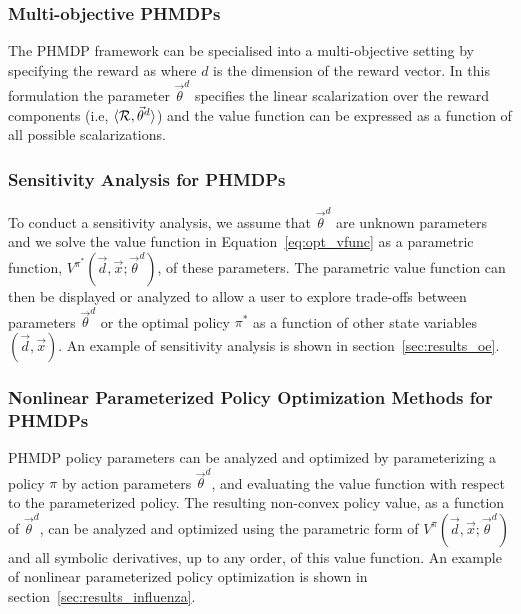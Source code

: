 \subsubsection{Multi-objective PHMDPs}

The PHMDP framework can be specialised into a multi-objective setting
by specifying the reward as {\footnotesize \MORewardFunc} where
{\footnotesize $ d $} is the dimension of the reward vector. In this
formulation the parameter {\footnotesize $ \vec{\theta}^{d} $} specifies the
linear scalarization over the reward components (i.e, {\footnotesize $\langle
\mathcal{R}, \vec{\theta}^{d} \rangle$}) and the value function can be expressed
as a function of all possible scalarizations.

\subsubsection{Sensitivity Analysis for PHMDPs}

To conduct a sensitivity analysis, we assume that {\footnotesize $\vec{\theta}^{d}$} are unknown parameters and we solve the value function in Equation~\eqref{eq:opt_vfunc} as a parametric function, {\footnotesize $V^{\pi^{*}}(\vec{d}, \vec{x}; \vec{\theta}^{d})$}, of these parameters. The parametric value function can then be displayed or analyzed to allow a user to explore trade-offs between parameters {\footnotesize $\vec{\theta}^{d}$} or the optimal policy {\footnotesize $ \pi^{*} $} as a function of other state variables {\footnotesize $(\vec{d}, \vec{x})$}. An example of sensitivity analysis is shown in section~\ref{sec:results_oe}.

\subsubsection{Nonlinear Parameterized Policy Optimization Methods for PHMDPs}

PHMDP policy parameters can be analyzed and optimized by parameterizing a policy {\footnotesize $\pi$} by action parameters {\footnotesize $\vec{\theta}^{d}$}, and evaluating the value function with respect to the parameterized policy. The resulting non-convex policy value, as a function of {\footnotesize $\vec{\theta}^{d}$}, can be analyzed and optimized using the parametric form of {\footnotesize $V^{\pi}(\vec{d}, \vec{x}; \vec{\theta}^{d})$} and all symbolic derivatives, up to any order, of this value function. An example of nonlinear parameterized policy optimization is shown in section~\ref{sec:results_influenza}. 



